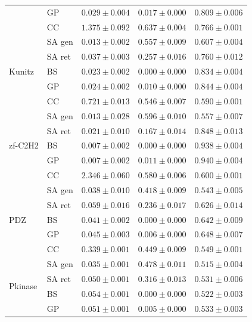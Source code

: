 \begin{table}[ht]
\begin{tabular}{@{}llccc@{}}
 & GP      & $0.029 \pm 0.004$ & $0.017 \pm 0.000$ & $0.809 \pm 0.006$ \\
 & CC      & $1.375 \pm 0.092$ & $0.637 \pm 0.004$ & $0.766 \pm 0.001$ \\
\midrule
\multirow{5}{*}{Kunitz}
 & SA gen  & $\mathbf{0.013 \pm 0.002}$ & $\mathbf{0.557 \pm 0.009}$ & $\mathbf{0.607 \pm 0.004}$ \\
 & SA ret  & $0.037 \pm 0.003$ & $0.257 \pm 0.016$ & $0.760 \pm 0.012$ \\
 & BS      & $0.023 \pm 0.002$ & $0.000 \pm 0.000$ & $0.834 \pm 0.004$ \\
 & GP      & $0.024 \pm 0.002$ & $0.010 \pm 0.000$ & $0.844 \pm 0.004$ \\
 & CC      & $0.721 \pm 0.013$ & $0.546 \pm 0.007$ & $0.590 \pm 0.001$ \\
\midrule
\multirow{5}{*}{zf-C2H2}
 & SA gen  & $0.013 \pm 0.028$ & $\mathbf{0.596 \pm 0.010}$ & $\mathbf{0.557 \pm 0.007}$ \\
 & SA ret  & $0.021 \pm 0.010$ & $0.167 \pm 0.014$ & $0.848 \pm 0.013$ \\
 & BS      & $\mathbf{0.007 \pm 0.002}$ & $0.000 \pm 0.000$ & $0.938 \pm 0.004$ \\
 & GP      & $\mathbf{0.007 \pm 0.002}$ & $0.011 \pm 0.000$ & $0.940 \pm 0.004$ \\
 & CC      & $2.346 \pm 0.060$ & $0.580 \pm 0.006$ & $0.600 \pm 0.001$ \\
\midrule
\multirow{5}{*}{PDZ}
 & SA gen  & $\mathbf{0.038 \pm 0.010}$ & $\mathbf{0.418 \pm 0.009}$ & $\mathbf{0.543 \pm 0.005}$ \\
 & SA ret  & $0.059 \pm 0.016$ & $0.236 \pm 0.017$ & $0.626 \pm 0.014$ \\
 & BS      & $0.041 \pm 0.002$ & $0.000 \pm 0.000$ & $0.642 \pm 0.009$ \\
 & GP      & $0.045 \pm 0.003$ & $0.006 \pm 0.000$ & $0.648 \pm 0.007$ \\
 & CC      & $0.339 \pm 0.001$ & $0.449 \pm 0.009$ & $0.549 \pm 0.001$ \\
\midrule
\multirow{5}{*}{Pkinase}
 & SA gen  & $\mathbf{0.035 \pm 0.001}$ & $\mathbf{0.478 \pm 0.011}$ & $0.515 \pm 0.004$ \\
 & SA ret  & $0.050 \pm 0.001$ & $0.316 \pm 0.013$ & $0.531 \pm 0.006$ \\
 & BS      & $0.054 \pm 0.001$ & $0.000 \pm 0.000$ & $0.522 \pm 0.003$ \\
 & GP      & $0.051 \pm 0.001$ & $0.005 \pm 0.000$ & $0.533 \pm 0.003$ \\

\end{tabular}
\end{table}
